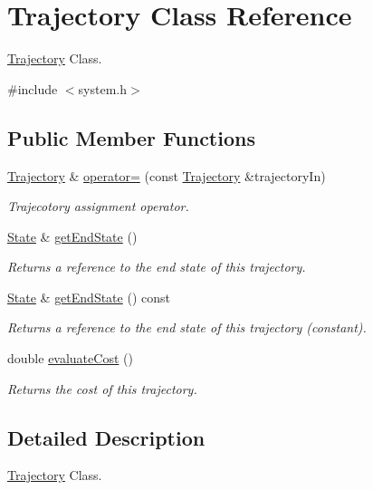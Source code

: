 \hypertarget{class_trajectory}{\section{Trajectory Class Reference}
\label{class_trajectory}
}


\hyperlink{class_trajectory}{Trajectory} Class.  




{\ttfamily \#include $<$system.\-h$>$}

\subsection*{Public Member Functions}
\begin{DoxyCompactItemize}
\item 
\hyperlink{class_trajectory}{Trajectory} \& \hyperlink{class_trajectory_a4986ad998ea5fec53c2c872fc3380ef3}{operator=} (const \hyperlink{class_trajectory}{Trajectory} \&trajectory\-In)
\begin{DoxyCompactList}\small\item\em Trajecotory assignment operator. \end{DoxyCompactList}\item 
\hyperlink{class_state}{State} \& \hyperlink{class_trajectory_adf4664f7691a16b0171e0ff0a05a239d}{get\-End\-State} ()
\begin{DoxyCompactList}\small\item\em Returns a reference to the end state of this trajectory. \end{DoxyCompactList}\item 
\hyperlink{class_state}{State} \& \hyperlink{class_trajectory_a422a1021bfbaa72048fc05d4a1e1616b}{get\-End\-State} () const 
\begin{DoxyCompactList}\small\item\em Returns a reference to the end state of this trajectory (constant). \end{DoxyCompactList}\item 
double \hyperlink{class_trajectory_aefa4bcabf72fbef3a892a826ae73d67c}{evaluate\-Cost} ()
\begin{DoxyCompactList}\small\item\em Returns the cost of this trajectory. \end{DoxyCompactList}\end{DoxyCompactItemize}


\subsection{Detailed Description}
\hyperlink{class_trajectory}{Trajectory} Class. 

